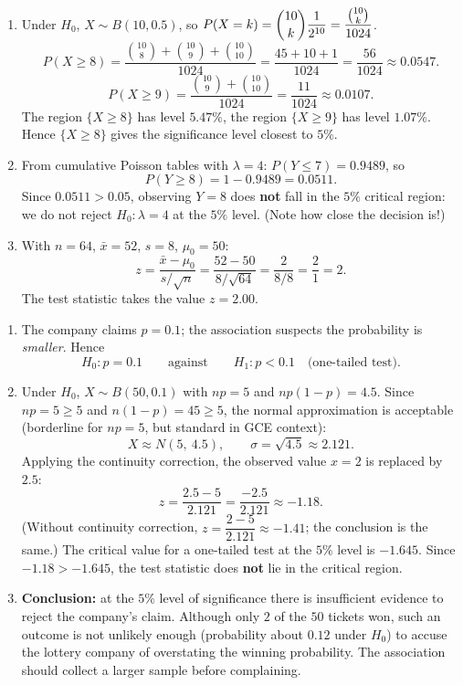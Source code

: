 \documentclass[11pt]{article}
\begin{document}
\begin{corrige}
\begin{enumerate}
\item Under $H_0$, $X \sim B(10, 0.5)$, so $P(X = k) = \dbinom{10}{k}\dfrac{1}{2^{10}} = \dfrac{\binom{10}{k}}{1024}$.
\[ P(X \geq 8) = \frac{\binom{10}{8} + \binom{10}{9} + \binom{10}{10}}{1024} = \frac{45 + 10 + 1}{1024} = \frac{56}{1024} \approx 0.0547. \]
\[ P(X \geq 9) = \frac{\binom{10}{9} + \binom{10}{10}}{1024} = \frac{11}{1024} \approx 0.0107. \]
The region $\{X \geq 8\}$ has level $5.47\%$, the region $\{X \geq 9\}$ has level $1.07\%$. Hence $\{X \geq 8\}$ gives the significance level closest to $5\%$.
\item From cumulative Poisson tables with $\lambda = 4$: $P(Y \leq 7) = 0.9489$, so
\[ P(Y \geq 8) = 1 - 0.9489 = 0.0511. \]
Since $0.0511 > 0.05$, observing $Y = 8$ does \textbf{not} fall in the $5\%$ critical region: we do not reject $H_0: \lambda = 4$ at the $5\%$ level. (Note how close the decision is!)
\item With $n = 64$, $\bar{x} = 52$, $s = 8$, $\mu_0 = 50$:
\[ z = \frac{\bar{x} - \mu_0}{s/\sqrt{n}} = \frac{52 - 50}{8/\sqrt{64}} = \frac{2}{8/8} = \frac{2}{1} = 2. \]
The test statistic takes the value $z = 2.00$.
\end{enumerate}
\end{corrige}

\begin{corrige}
\begin{enumerate}
\item The company claims $p = 0.1$; the association suspects the probability is \emph{smaller}. Hence
\[ H_0: p = 0.1 \qquad \text{against} \qquad H_1: p < 0.1 \quad \text{(one-tailed test).} \]
\item Under $H_0$, $X \sim B(50, 0.1)$ with $np = 5$ and $np(1-p) = 4.5$. Since $np = 5 \geq 5$ and $n(1-p) = 45 \geq 5$, the normal approximation is acceptable (borderline for $np=5$, but standard in GCE context):
\[ X \approx N(5,\ 4.5), \qquad \sigma = \sqrt{4.5} \approx 2.121. \]
Applying the continuity correction, the observed value $x = 2$ is replaced by $2.5$:
\[ z = \frac{2.5 - 5}{2.121} = \frac{-2.5}{2.121} \approx -1.18. \]
(Without continuity correction, $z = \dfrac{2-5}{2.121} \approx -1.41$; the conclusion is the same.)
The critical value for a one-tailed test at the $5\%$ level is $-1.645$. Since $-1.18 > -1.645$, the test statistic does \textbf{not} lie in the critical region.
\item \textbf{Conclusion:} at the $5\%$ level of significance there is insufficient evidence to reject the company's claim. Although only $2$ of the $50$ tickets won, such an outcome is not unlikely enough (probability about $0.12$ under $H_0$) to accuse the lottery company of overstating the winning probability. The association should collect a larger sample before complaining.
\end{enumerate}
\end{corrige}
\end{document}
